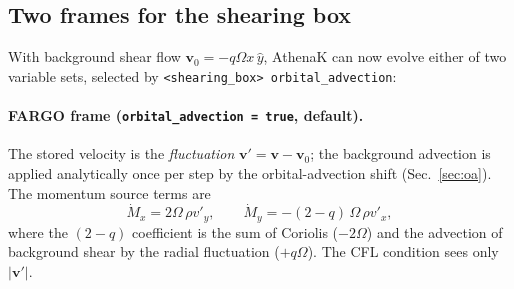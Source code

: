 \documentclass[11pt]{article}
\newcommand{\code}[1]{\texttt{#1}}
\begin{document}
\subsection{Two frames for the shearing box}
With background shear flow $\mathbf{v}_0 = -q\Omega x\,\hat y$, AthenaK can now evolve
either of two variable sets, selected by \code{<shearing\_box> orbital\_advection}:

\paragraph{FARGO frame (\code{orbital\_advection = true}, default).} The stored
velocity is the \emph{fluctuation} $\mathbf{v}' = \mathbf{v}-\mathbf{v}_0$; the
background advection is applied analytically once per step by the orbital-advection
shift (Sec.~\ref{sec:oa}). The momentum source terms are
\begin{equation}
  \dot M_x = 2\Omega\,\rho v'_y, \qquad
  \dot M_y = -(2-q)\,\Omega\,\rho v'_x ,
  \label{eq:fargo_src}
\end{equation}
where the $(2-q)$ coefficient is the sum of Coriolis ($-2\Omega$) and the advection of
background shear by the radial fluctuation ($+q\Omega$). The CFL condition sees only
$|\mathbf{v}'|$.
\end{document}
